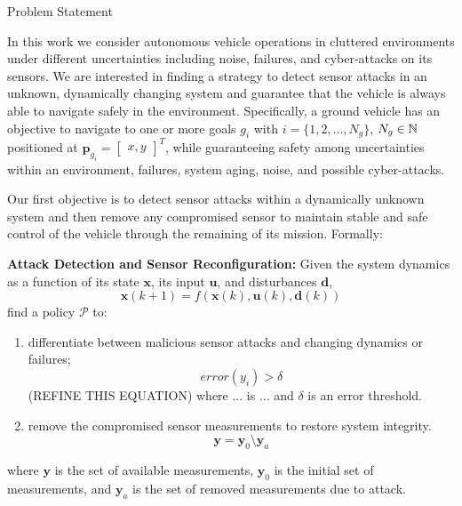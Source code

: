 \begin{section}{Problem Statement}
	
\label{sec:problem}

In this work we consider autonomous vehicle operations in cluttered environments under different uncertainties including noise, failures, and cyber-attacks on its sensors. 
We are interested in finding a strategy to detect sensor attacks in an unknown, dynamically changing system and guarantee that the vehicle is always able to navigate safely in the environment. Specifically, a ground vehicle has an objective to navigate to one or more goals $g_i$ with $ i = \{1, 2, \dots, N_g\}$, $N_g \in \mathbb{N}$ positioned at $\bm{p}_{g_i}={\begin{bmatrix} x,y \end{bmatrix}}^T$, while guaranteeing safety among uncertainties within an environment, failures, system aging, noise, and possible cyber-attacks.



Our first objective is to detect sensor attacks within a dynamically unknown system and then remove any compromised sensor to maintain stable and safe control of the vehicle through the remaining of its mission. Formally:

\begin{problem} 
\label{problem1} {\textbf{Attack Detection and Sensor Reconfiguration:}} 
 Given the system dynamics as a function of its state $ \bm{x} $, its input $ \bm{u}$, and disturbances $ \bm{d} $,
	\begin{equation}
		\bm{x}(k+1) = f(\bm{x}(k), \bm{u}(k), \bm{d}(k))
	\end{equation}
find a policy $\mathcal{P}$ to:
\begin{enumerate}
	\item differentiate between malicious sensor attacks and changing dynamics or failures; 
	\begin{equation}
	\label{eq:detect_attack}
	    error(y_i) > \delta
	\end{equation}
	(REFINE THIS EQUATION)
	where ... is ... and $\delta$ is an error threshold.
	\item remove the compromised sensor measurements to restore system integrity.
	\begin{equation}
	\label{eq:remove_sensors}
	    \bm{y}=\bm{y}_0 \setminus \bm{y}_a
	\end{equation}
\end{enumerate}
where $\bm{y}$ is the set of available measurements, $\bm{y}_0$ is the initial set of measurements, and $\bm{y}_a$ is the set of removed measurements due to attack.



\end{problem}
\end{section}
